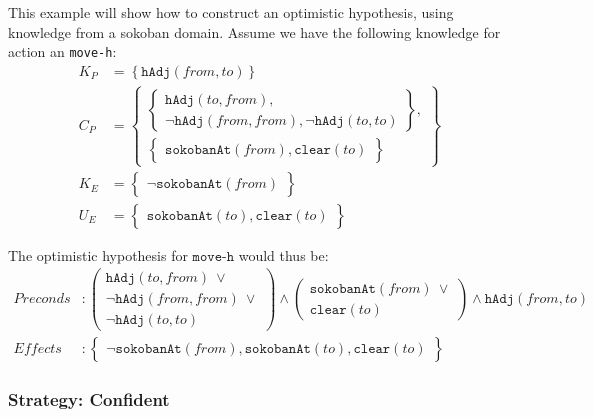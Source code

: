 \documentclass[../Master.tex]{subfiles}
\begin{document}
	\begin{example}
		This example will show how to construct an optimistic hypothesis, using knowledge from a sokoban domain.
		Assume we have the following knowledge for action an \texttt{move-h}:
		 	\begin{equation*}
			 	\begin{split}
				 	K_P & = \left\{\texttt{hAdj}(from, to) \right\} \\
					C_P& =	\left\{
							\begin{gathered}
								\left\{
								\begin{gathered}
									\texttt{hAdj}(to, from), \\
									\neg\texttt{hAdj}(from, from), \neg\texttt{hAdj}(to, to)
								\end{gathered}
								\right\},	\\ \left\{
								\begin{gathered}
									\texttt{sokobanAt}(from), \texttt{clear}(to)
								\end{gathered}
								\right\}
							\end{gathered}
							\right\}				
				 	\\
				 	K_E& = 
						 	\left\{
						 	\begin{gathered}
							 	\neg\texttt{sokobanAt}(from)
						 	\end{gathered}
						 	\right\}
					\\
				 	U_E& = 
					 	\left\{
					 	\begin{gathered}
						 	\texttt{sokobanAt}(to),
						 	\texttt{clear}(to)
					 	\end{gathered}
					 	\right\}
				\end{split}		
		 	\end{equation*}
		 	
		The optimistic hypothesis for $\texttt{move-h}$ would thus be:
			\begin{equation*}
				\begin{split}
					Preconds& :\left(
									 \begin{gathered} 
									   \texttt{hAdj}(to, from) ~ \lor \\
									  \neg\texttt{hAdj}(from, from) ~ \lor \\ \neg\texttt{hAdj}(to, to) 
									 \end{gathered}
								  \right) \land
								  \left(
									  \begin{gathered}
										  \texttt{sokobanAt}(from) ~ \lor \\ \texttt{clear}(to)
									  \end{gathered}
								  \right) \land \texttt{hAdj}(from, to) \\
					Effects &: 	\left\{
									\begin{gathered}
										\neg\texttt{sokobanAt}(from),
										\texttt{sokobanAt}(to),
										\texttt{clear}(to)
									\end{gathered}
								\right\} 				
				\end{split}				
			\end{equation*}
	\end{example}	

\subsubsection{Strategy: Confident}
\end{document}
